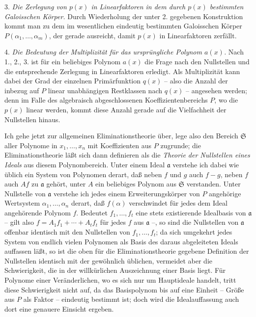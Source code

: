 \documentclass[11pt]{article}
\begin{document}
3. \emph{Die Zerlegung von $p(x)$ in Linearfaktoren in dem durch $p(x)$ bestimmten Galoisschen Körper.} Durch Wiederholung der unter 2. gegebenen Konstruktion kommt man zu dem im wesentlichen eindeutig bestimmten Galoisschen Körper $P(\alpha_1,\ldots,\alpha_m)$, der gerade ausreicht, damit $p(x)$ in Linearfaktoren zerfällt.

4. \emph{Die Bedeutung der Multiplizität für das ursprüngliche Polynom $a(x)$.} Nach 1., 2., 3. ist für ein beliebiges Polynom $a(x)$ die Frage nach den Nullstellen und die entsprechende Zerlegung in Linearfaktoren erledigt. Als Multiplizität kann dabei der Grad der einzelnen Primärfunktion $q(x)$ -- also die Anzahl der inbezug auf $P$ linear unabhängigen Restklassen nach $q(x)$ -- angesehen werden; denn im Falle des algebraisch abgeschlossenen Koeffizientenbereichs $P$, wo die $p(x)$ linear werden, kommt diese Anzahl gerade auf die Vielfachheit der Nullstellen hinaus.

Ich gehe jetzt zur allgemeinen Eliminationstheorie über, lege also den Bereich $\mathfrak S$ aller Polynome in $x_1,\ldots,x_n$ mit Koeffizienten aus $P$ zugrunde; die Eliminationstheorie läßt sich dann definieren als die \emph{Theorie der Nullstellen eines Ideals} aus diesem Polynombereich. Unter einem Ideal $\mathfrak a$ verstehe ich dabei wie üblich ein System von Polynomen derart, daß neben $f$ und $g$ auch $f-g$, neben $f$ auch $Af$ zu $\mathfrak a$ gehört, unter $A$ ein beliebiges Polynom aus $\mathfrak S$ verstanden. Unter Nullstelle von $\mathfrak a$ verstehe ich jedes einem Erweiterungskörper von $P$ angehörige Wertsystem $\alpha_1,\ldots,\alpha_n$ derart, daß $f(\alpha)$ verschwindet für jedes dem Ideal angehörende Polynom $f$. Bedeutet $f_1,\ldots,f_t$ eine stets existierende Idealbasis von $\mathfrak a$ -- gilt also $f=A_1f_1+\cdots+A_tf_t$ für jedes $f$ aus $\mathfrak a$ --, so sind die Nullstellen von $\mathfrak a$ offenbar identisch mit den Nullstellen von $f_1,\ldots,f_t$; da sich umgekehrt jedes System von endlich vielen Polynomen als Basis des daraus abgeleiteten Ideals auffassen läßt, so ist die oben für die Eliminationstheorie gegebene Definition der Nullstellen identisch mit der gewöhnlich üblichen, vermeidet aber die Schwierigkeit, die in der willkürlichen Auszeichnung einer Basis liegt. Für Polynome einer Veränderlichen, wo es sich nur um Hauptideale handelt, tritt diese Schwierigkeit nicht auf, da das Basispolynom bis auf eine Einheit -- Größe aus $P$ als Faktor -- eindeutig bestimmt ist; doch wird die Idealauffassung auch dort eine genauere Einsicht ergeben.
\end{document}
